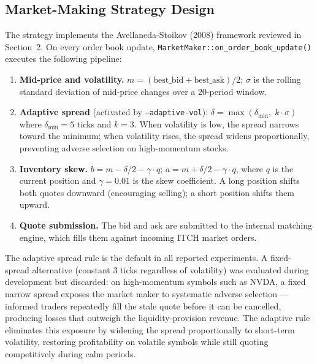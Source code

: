 \documentclass[12pt]{article}
\begin{document}
\clearpage
\subsection{Market-Making Strategy Design}

The strategy implements the Avellaneda-Stoikov (2008) framework
\cite{avellaneda2008} reviewed in Section~2.
On every order book update, \texttt{MarketMaker::on\_order\_book\_update()}
executes the following pipeline:

\begin{enumerate}
  \item \textbf{Mid-price and volatility.}
        $m = (\text{best\_bid} + \text{best\_ask}) / 2$;
        $\sigma$ is the rolling standard deviation of mid-price changes
        over a 20-period window.
  \item \textbf{Adaptive spread} (activated by \texttt{--adaptive-vol}):
        $\delta = \max(\delta_{\min},\; k \cdot \sigma)$
        where $\delta_{\min} = 5$ ticks and $k = 3$.
        When volatility is low, the spread narrows toward the minimum;
        when volatility rises, the spread widens proportionally,
        preventing adverse selection on high-momentum stocks.
  \item \textbf{Inventory skew.}
        $b = m - \delta/2 - \gamma \cdot q$;\quad
        $a = m + \delta/2 - \gamma \cdot q$,
        where $q$ is the current position and $\gamma = 0.01$ is the
        skew coefficient.
        A long position shifts both quotes downward (encouraging selling);
        a short position shifts them upward.
  \item \textbf{Quote submission.}
        The bid and ask are submitted to the internal matching engine,
        which fills them against incoming ITCH market orders.
\end{enumerate}

The adaptive spread rule is the default in all reported experiments.
A fixed-spread alternative (constant 3 ticks regardless of volatility)
was evaluated during development but discarded: on high-momentum symbols
such as NVDA, a fixed narrow spread exposes the market maker to
systematic adverse selection — informed traders repeatedly fill the
stale quote before it can be cancelled, producing losses that outweigh
the liquidity-provision revenue.
The adaptive rule eliminates this exposure by widening the spread
proportionally to short-term volatility, restoring profitability on
volatile symbols while still quoting competitively during calm periods.
\end{document}
